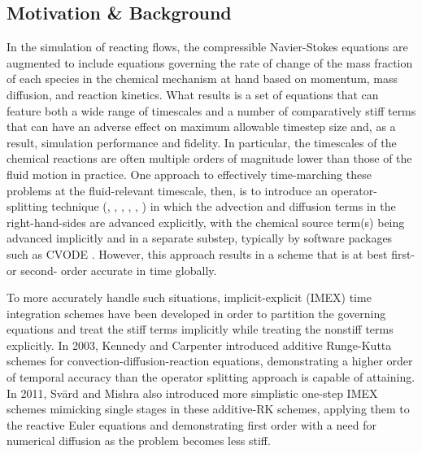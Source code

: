 \subsection{Motivation \& Background} \label{sec:timeint_bg}


In the simulation of reacting flows, the compressible Navier-Stokes
equations are augmented to include equations governing the rate of
change of the mass fraction of each species in the chemical mechanism
at hand based on momentum, mass diffusion, and reaction kinetics. What
results is a set of equations that can feature both a wide range of
timescales and a number of comparatively stiff terms that can have
an adverse effect on maximum allowable timestep size and, as a result,
simulation performance and fidelity. In particular, the timescales
of the chemical reactions are often multiple orders of magnitude lower
than those of the fluid motion in practice. One approach to effectively
time-marching these problems at the fluid-relevant timescale, then, is
to introduce an operator-splitting technique (\cite{sportisse2000method},
\cite{strang1968construction}, \cite{lapointe2020data}, \cite{macart2016semi},
\cite{ren2008second}, \cite{knio1999semi}) in which the advection
and diffusion terms in the right-hand-sides are advanced explicitly,
with the chemical source term(s) being advanced implicitly and
in a separate substep, typically by software packages such as CVODE \cite{cohen1996cvode}.
However, this approach results in a scheme that is at best
first- or second- order accurate in time globally.

To more accurately handle such situations, implicit-explicit (IMEX) time
integration schemes have been developed in order to partition the
governing equations and treat the stiff terms implicitly while treating
the nonstiff terms explicitly. In 2003, Kennedy and Carpenter \cite{kennedy2003additive}
introduced additive Runge-Kutta schemes for convection-diffusion-reaction equations,
demonstrating a higher order of temporal accuracy than the operator splitting
approach is capable of attaining. In 2011, Sv{\"a}rd and Mishra \cite{svard2011implicit}
also introduced more simplistic one-step IMEX schemes mimicking single stages in these
additive-RK schemes, applying them to the reactive Euler equations and
demonstrating first order with a need for numerical diffusion as the problem
becomes less stiff.


